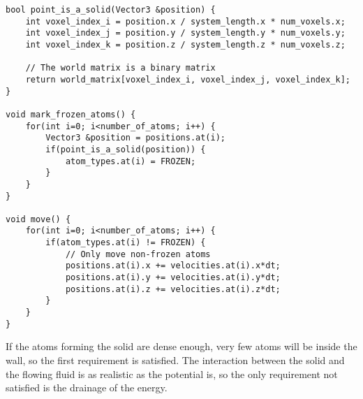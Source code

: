 \begin{lstlisting}[caption=Example code showing how to mark atoms within a solid., label=lst:md_simple_solid]
bool point_is_a_solid(Vector3 &position) {
	int voxel_index_i = position.x / system_length.x * num_voxels.x;
	int voxel_index_j = position.y / system_length.y * num_voxels.y;
	int voxel_index_k = position.z / system_length.z * num_voxels.z;

	// The world matrix is a binary matrix
	return world_matrix[voxel_index_i, voxel_index_j, voxel_index_k];
}

void mark_frozen_atoms() {
	for(int i=0; i<number_of_atoms; i++) {
		Vector3 &position = positions.at(i);
		if(point_is_a_solid(position)) {
			atom_types.at(i) = FROZEN;
		}
	}
}

void move() {
	for(int i=0; i<number_of_atoms; i++) {
		if(atom_types.at(i) != FROZEN) {
			// Only move non-frozen atoms
			positions.at(i).x += velocities.at(i).x*dt;
			positions.at(i).y += velocities.at(i).y*dt;
			positions.at(i).z += velocities.at(i).z*dt;
		}
	}
}
\end{lstlisting}
If the atoms forming the solid are dense enough, very few atoms will be inside the wall, so the first requirement is satisfied. The interaction between the solid and the flowing fluid is as realistic as the potential is, so the only requirement not satisfied is the drainage of the energy. %

